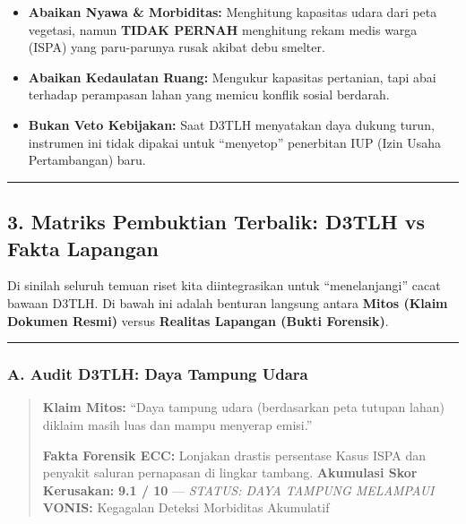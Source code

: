 \documentclass[
]{article}
\providecommand{\tightlist}{%
  \setlength{\itemsep}{0pt}\setlength{\parskip}{0pt}}
\begin{document}
\begin{itemize}
\tightlist
\item
  \textbf{Abaikan Nyawa \& Morbiditas:} Menghitung kapasitas udara dari
  peta vegetasi, namun \textbf{TIDAK PERNAH} menghitung rekam medis
  warga (ISPA) yang paru-parunya rusak akibat debu smelter.
\item
  \textbf{Abaikan Kedaulatan Ruang:} Mengukur kapasitas pertanian, tapi
  abai terhadap perampasan lahan yang memicu konflik sosial berdarah.
\item
  \textbf{Bukan Veto Kebijakan:} Saat D3TLH menyatakan daya dukung
  turun, instrumen ini tidak dipakai untuk ``menyetop'' penerbitan IUP
  (Izin Usaha Pertambangan) baru.
\end{itemize}

\begin{center}\rule{0.5\linewidth}{0.5pt}\end{center}

\subsection{3. Matriks Pembuktian Terbalik: D3TLH vs Fakta
Lapangan}\label{matriks-pembuktian-terbalik-d3tlh-vs-fakta-lapangan}

Di sinilah seluruh temuan riset kita diintegrasikan untuk
``menelanjangi'' cacat bawaan D3TLH. Di bawah ini adalah benturan
langsung antara \textbf{Mitos (Klaim Dokumen Resmi)} versus
\textbf{Realitas Lapangan (Bukti Forensik)}.

\begin{center}\rule{0.5\linewidth}{0.5pt}\end{center}

\subsubsection{A. Audit D3TLH: Daya Tampung
Udara}\label{a.-audit-d3tlh-daya-tampung-udara}

\begin{quote}
\textbf{Klaim Mitos:} ``Daya tampung udara (berdasarkan peta tutupan
lahan) diklaim masih luas dan mampu menyerap emisi.''

\textbf{Fakta Forensik ECC:} Lonjakan drastis persentase Kasus ISPA dan
penyakit saluran pernapasan di lingkar tambang. \textbf{Akumulasi Skor
Kerusakan:} \textbf{9.1 / 10} --- \emph{STATUS: DAYA TAMPUNG MELAMPAUI}
\textbf{VONIS:} Kegagalan Deteksi Morbiditas Akumulatif
\end{quote}
\end{document}
